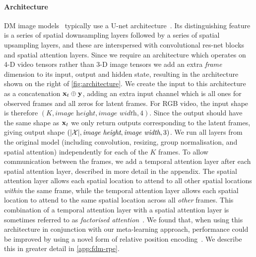 \paragraph{Architecture}
\label{sec:fdm-architecture}
DM image models~\citep{ho2020denoising,nichol2021improved} typically use a U-net architecture~\cite{ronneberger2015u}. Its distinguishing feature is a series of spatial downsampling layers followed by a series of spatial upsampling layers, and these are interspersed with convolutional res-net blocks~\cite{he2015deep} and spatial attention layers. Since we require an architecture which operates on 4-D video tensors rather than 3-D image tensors we add an extra \textit{frame} dimension to its input, output and hidden state, resulting in the architecture shown on the right of \cref{fig:architecture}. We create the input to this architecture as a concatenation ${\mathbf{x}}_t \oplus {\mathbf{y}}$, adding an extra input channel which is all ones for observed frames and all zeros for latent frames. For RGB video, the input shape is therefore $(K, \textit{image height}, \textit{image width}, 4)$. Since the output should have the same shape as ${\mathbf{x}}_t$ we only return outputs corresponding to the latent frames, giving output shape  $(|\mathcal{X}|, \textit{image height}, \textit{image width}, 3)$. We run all layers from the original model (including convolution, resizing, group normalisation, and spatial attention) independently for each of the $K$ frames.
To allow communication between the frames, we add a temporal attention layer after each spatial attention layer, described in more detail in the appendix. 
%
The spatial attention layer allows each spatial location to attend to all other spatial locations \textit{within} the same frame, while the temporal attention layer allows each spatial location to attend to the same spatial location across all \textit{other} frames.
%
This combination of a temporal attention layer with a spatial attention layer is sometimes referred to as \textit{factorised attention}~\citep{tashiro2021csdi,ho2022video}. We found that, when using this architecture in conjunction with our meta-learning approach, performance could be improved by using a novel form of relative position encoding~\cite{shaw2018self,wu2021rethinking}. We describe this in greater detail in \cref{app:fdm-rpe}.

